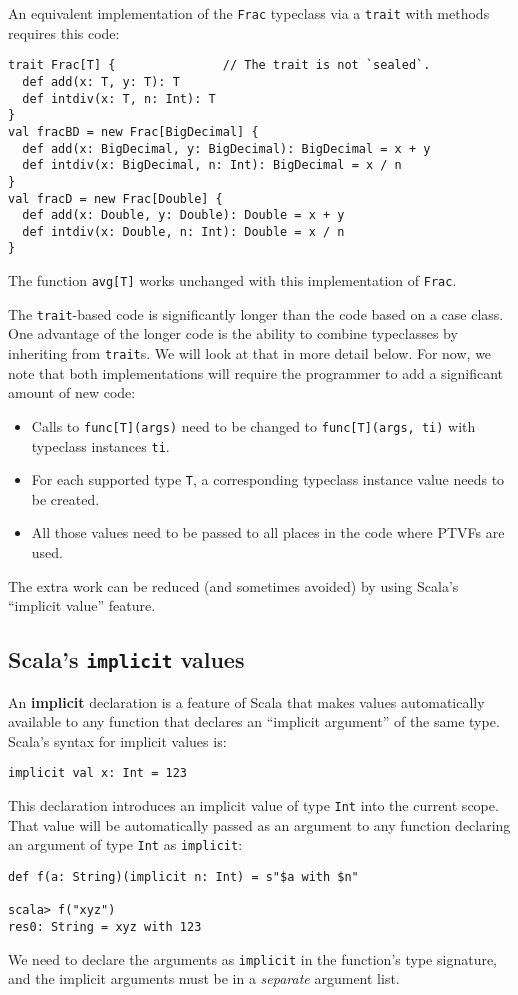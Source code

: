 An equivalent implementation of the \lstinline!Frac! typeclass via
a \lstinline!trait! with methods requires this code:
\begin{lstlisting}
trait Frac[T] {               // The trait is not `sealed`.
  def add(x: T, y: T): T
  def intdiv(x: T, n: Int): T
}
val fracBD = new Frac[BigDecimal] {
  def add(x: BigDecimal, y: BigDecimal): BigDecimal = x + y
  def intdiv(x: BigDecimal, n: Int): BigDecimal = x / n
}
val fracD = new Frac[Double] {
  def add(x: Double, y: Double): Double = x + y
  def intdiv(x: Double, n: Int): Double = x / n
}
\end{lstlisting}
The function \lstinline!avg[T]! works unchanged with this implementation
of \lstinline!Frac!.

The \lstinline!trait!-based code is significantly longer than the
code based on a case class. One advantage of the longer code is the
ability to combine typeclasses by inheriting from \lstinline!trait!s.
We will look at that in more detail below. For now, we note that both
implementations will require the programmer to add a significant amount
of new code:
\begin{itemize}
\item Calls to \lstinline!func[T](args)! need to be changed to \lstinline!func[T](args, ti)!
with typeclass instances \lstinline!ti!.
\item For each supported type \lstinline!T!, a corresponding typeclass
instance value needs to be created.
\item All those values need to be passed to all places in the code where
PTVFs are used.
\end{itemize}
The extra work can be reduced (and sometimes avoided) by using Scala\textsf{'}s
\textsf{``}implicit value\textsf{''} feature. 

\subsection{Scala\textsf{'}s \texttt{implicit} values}

An \textbf{implicit } declaration is a feature
of Scala that makes values automatically available to any function
that declares an \textsf{``}implicit argument\textsf{''} of the same type. Scala\textsf{'}s
syntax for implicit values is:
\begin{lstlisting}
implicit val x: Int = 123
\end{lstlisting}
This declaration introduces an implicit value of type \lstinline!Int!
into the current scope. That value will be automatically passed as
an argument to any function declaring an argument of type \lstinline!Int!
as \lstinline!implicit!:
\begin{lstlisting}
def f(a: String)(implicit n: Int) = s"$a with $n"

scala> f("xyz")
res0: String = xyz with 123
\end{lstlisting}
We need to declare the arguments as \lstinline!implicit! in the function\textsf{'}s
type signature, and the implicit arguments must be in a \emph{separate}
argument list.

